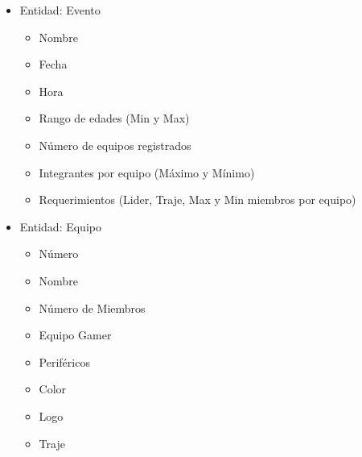 \documentclass[a4paper,12pt]{article}
\begin{document}
\begin{itemize}
\item Entidad: Evento
\begin{itemize}
\item Nombre
\item Fecha
\item Hora
\item Rango de edades (Min y Max)
\item Número de equipos registrados
\item Integrantes por equipo (Máximo y Mínimo)
\item Requerimientos (Lider, Traje, Max y Min miembros por equipo)
\end{itemize}

\item Entidad: Equipo
\begin{itemize}
\item Número
\item Nombre
\item Número de Miembros
\item Equipo Gamer
\item Periféricos
\item Color
\item Logo
\item Traje
\end{itemize}

\end{itemize}
\end{document}
